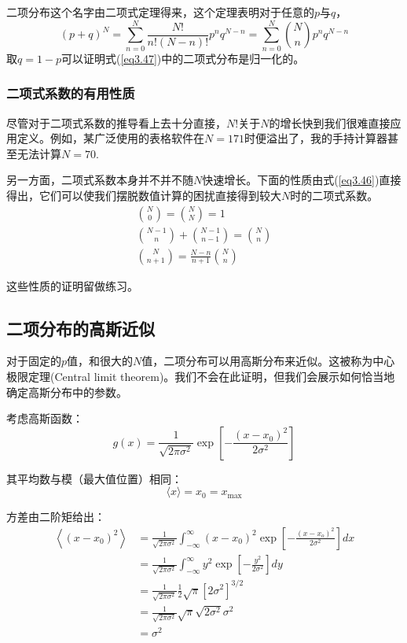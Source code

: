 \documentclass[UTF8]{ctexart}
\numberwithin{equation}{section}%
\numberwithin{figure}{section}%
\begin{document}
    二项分布这个名字由二项式定理得来，这个定理表明对于任意的$p$与$q$，
    \begin{equation}
        (p+q)^N=\sum^N_{n=0}\frac{N!}{n!(N-n)!}p^nq^{N-n}=\sum^N_{n=0}\binom{N}{n}p^nq^{N-n}
    \end{equation}
    取$q=1-p$可以证明式(\ref{eq3.47})中的二项式分布是归一化的。
    \subsubsection{二项式系数的有用性质}
    尽管对于二项式系数的推导看上去十分直接，$N!$关于$N$的增长快到我们很难直接应用定义。例如，某广泛使用的表格软件在$N=171$时便溢出了，我的手持计算器甚至无法计算$N=70$.

    另一方面，二项式系数本身并不并不随$N$快速增长。下面的性质由式(\ref{eq3.46})直接得出，它们可以使我们摆脱数值计算的困扰直接得到较大$N$时的二项式系数。
    \begin{align}
    \binom{N}{0}=\binom{N}{N}=1\\
    \binom{N-1}{n}+\binom{N-1}{n-1}=\binom{N}{n}\\
    \binom{N}{n+1}=\frac{N-n}{n+1}\binom{N}{n}
    \end{align}
    
    这些性质的证明留做练习。

    \subsection{二项分布的高斯近似}\label{sec3.9}
    对于固定的$p$值，和很大的$N$值，二项分布可以用高斯分布来近似。这被称为中心极限定理(Central limit theorem)。我们不会在此证明，但我们会展示如何恰当地确定高斯分布中的参数。

    考虑高斯函数：
    \begin{equation}
    g(x)=\frac{1}{\sqrt{2 \pi \sigma^{2}}} \exp \left[-\frac{\left(x-x_{0}\right)^{2}}{2 \sigma^{2}}\right]
    \end{equation}

    其平均数与模（最大值位置）相同：
    \begin{equation}
        \langle x\rangle=x_{0}=x_{\max }
    \end{equation}

    方差由二阶矩给出：
    \begin{equation}
        \begin{aligned}
            \left\langle\left(x-x_{0}\right)^{2}\right\rangle &=\frac{1}{\sqrt{2 \pi \sigma^{2}}} \int_{-\infty}^{\infty}\left(x-x_{0}\right)^{2} \exp \left[-\frac{\left(x-x_{o}\right)^{2}}{2 \sigma^{2}}\right] d x \\
            &=\frac{1}{\sqrt{2 \pi \sigma^{2}}} \int_{-\infty}^{\infty} y^{2} \exp \left[-\frac{y^{2}}{2 \sigma^{2}}\right] d y \\
            &=\frac{1}{\sqrt{2 \pi \sigma^{2}}} \frac{1}{2} \sqrt{\pi}\left[2 \sigma^{2}\right]^{3 / 2} \\
            &=\frac{1}{\sqrt{2 \pi \sigma^{2}}} \sqrt{\pi} \sqrt{2 \sigma^{2}} \sigma^{2} \\
            &=\sigma^{2}
            \end{aligned}
    \end{equation}
    
\end{document}
